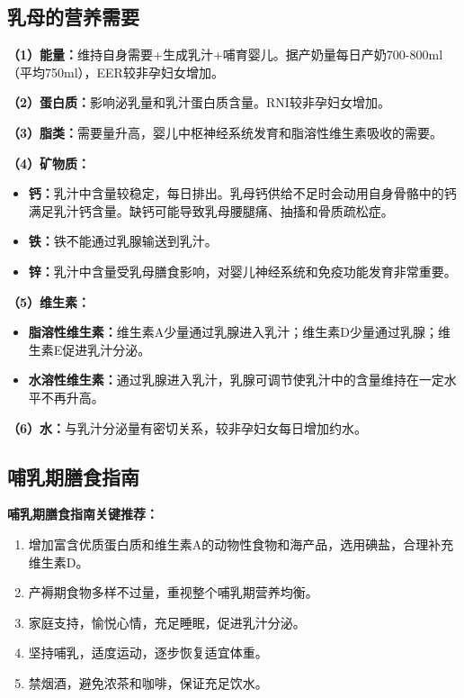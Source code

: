 \subsection{乳母的营养需要}

\begin{keybox}
\textbf{（1）能量：}维持自身需要+生成乳汁+哺育婴儿。据产奶量每日产奶700-800ml（平均750ml），EER较非孕妇女增加。

\textbf{（2）蛋白质：}影响泌乳量和乳汁蛋白质含量。RNI较非孕妇女增加。

\textbf{（3）脂类：}需要量升高，婴儿中枢神经系统发育和脂溶性维生素吸收的需要。

\textbf{（4）矿物质：}
\begin{itemize}[leftmargin=*]
    \item \textbf{钙：}乳汁中含量较稳定，每日排出。乳母钙供给不足时会动用自身骨骼中的钙满足乳汁钙含量。缺钙可能导致乳母腰腿痛、抽搐和骨质疏松症。
    \item \textbf{铁：}铁不能通过乳腺输送到乳汁。
    \item \textbf{锌：}乳汁中含量受乳母膳食影响，对婴儿神经系统和免疫功能发育非常重要。
\end{itemize}

\textbf{（5）维生素：}
\begin{itemize}[leftmargin=*]
    \item \textbf{脂溶性维生素：}维生素A少量通过乳腺进入乳汁；维生素D少量通过乳腺；维生素E促进乳汁分泌。
    \item \textbf{水溶性维生素：}通过乳腺进入乳汁，乳腺可调节使乳汁中的含量维持在一定水平不再升高。
\end{itemize}

\textbf{（6）水：}与乳汁分泌量有密切关系，较非孕妇女每日增加约水。
\end{keybox}

\subsection{哺乳期膳食指南}

\begin{keybox}
\textbf{哺乳期膳食指南关键推荐：}
\begin{enumerate}[leftmargin=*]
    \item 增加富含优质蛋白质和维生素A的动物性食物和海产品，选用碘盐，合理补充维生素D。
    \item 产褥期食物多样不过量，重视整个哺乳期营养均衡。
    \item 家庭支持，愉悦心情，充足睡眠，促进乳汁分泌。
    \item 坚持哺乳，适度运动，逐步恢复适宜体重。
    \item 禁烟酒，避免浓茶和咖啡，保证充足饮水。
\end{enumerate}
\end{keybox}

